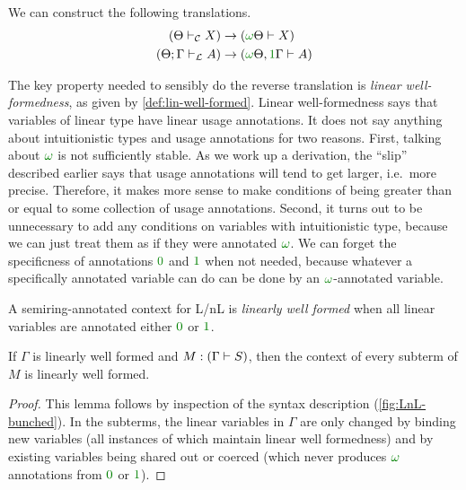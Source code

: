 \begin{proposition}\label{thm:lnl-to-enc}
  We can construct the following translations.
  \begin{align}
    (\Theta \vdashC X) &\to (\gr\omega\Theta \vdash X) \\
    (\Theta; \Gamma \vdashL A) &\to (\gr\omega\Theta, \gr1\Gamma \vdash A)
  \end{align}
\end{proposition}

The key property needed to sensibly do the reverse translation is
\emph{linear well-formedness}, as given by \cref{def:lin-well-formed}.
Linear well-formedness says that variables of linear type have linear usage
annotations.
It does not say anything about intuitionistic types and usage annotations for
two reasons.
First, talking about $\gr\omega$ is not sufficiently stable.
As we work up a derivation, the ``slip'' described earlier says that usage
annotations will tend to get larger, i.e.\ more precise.
Therefore, it makes more sense to make conditions of being greater than or equal
to some collection of usage annotations.
Second, it turns out to be unnecessary to add any conditions on variables with
intuitionistic type, because we can just treat them as if they were annotated
$\gr\omega$.
We can forget the specificness of annotations $\gr0$ and $\gr1$ when not needed,
because whatever a specifically annotated variable can do can be done by an
$\gr\omega$-annotated variable.

\begin{definition}\label{def:lin-well-formed}
  A semiring-annotated context for L/nL is \emph{linearly well formed} when all
  linear variables are annotated either $\gr0$ or $\gr1$.
\end{definition}

\begin{lemma}\label{thm:lwf}
  If $\Gamma$ is linearly well formed and $M : \plr{\Gamma \vdash S}$, then the
  context of every subterm of $M$ is linearly well formed.
\end{lemma}
\begin{proof}
  This lemma follows by inspection of the syntax description
  (\cref{fig:LnL-bunched}).
  In the subterms, the linear variables in $\Gamma$ are only changed by binding
  new variables (all instances of which maintain linear well formedness) and by
  existing variables being shared out or coerced (which never produces
  $\gr\omega$ annotations from $\gr0$ or $\gr1$).
\end{proof}


